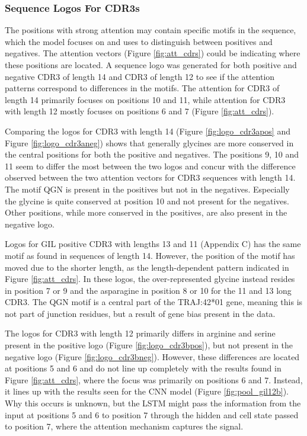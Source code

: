 \subsubsection{Sequence Logos For CDR3s}
The positions with strong attention may contain specific motifs in the sequence, which the model focuses on and uses to distinguish between positives and negatives. The attention vectors (Figure \ref{fig:att_cdrs}) could be indicating where these positions are located. A sequence logo was generated for both positive and negative CDR3{\textalpha} of length 14 and CDR3{\textbeta} of length 12 to see if the attention patterns correspond to differences in the motifs. The attention for CDR3{\textalpha} of length 14 primarily focuses on positions 10 and 11, while attention for CDR3{\textbeta} with length 12 mostly focuses on positions 6 and 7 (Figure \ref{fig:att_cdrs}). 

Comparing the logos for CDR3{\textalpha} with length 14 (Figure \ref{fig:logo_cdr3apos} and Figure \ref{fig:logo_cdr3aneg}) shows that generally glycines are more conserved in the central positions for both the positive and negatives. The positions 9, 10 and 11 seem to differ the most between the two logos and concur with the difference observed between the two attention vectors for CDR3{\textalpha} sequences with length 14. The motif QGN is present in the positives but not in the negatives. Especially the glycine is quite conserved at position 10 and not present for the negatives. Other positions, while more conserved in the positives, are also present in the negative logo.

Logos for GIL positive CDR3{\textalpha} with lengths 13 and 11 (Appendix C) has the same motif as found in sequences of length 14. However, the position of the motif has moved due to the shorter length, as the length-dependent pattern indicated in Figure \ref{fig:att_cdrs}. In these logos, the over-represented glycine instead resides in position 7 or 9 and the asparagine in position 8 or 10 for the 11 and 13 long CDR3{\textalpha}. The QGN motif is a central part of the TRAJ:42*01 gene, meaning this is not part of junction residues, but a result of gene bias present in the data.

The logos for CDR3{\textbeta} with length 12 primarily differs in arginine and serine present in the positive logo (Figure \ref{fig:logo_cdr3bpos}), but not present in the negative logo (Figure \ref{fig:logo_cdr3bneg}). However, these differences are located at positions 5 and 6 and do not line up completely with the results found in Figure \ref{fig:att_cdrs}, where the focus was primarily on positions 6 and 7. Instead, it lines up with the results seen for the CNN model (Figure \ref{fig:pool_gil12b}). Why this occurs is unknown, but the LSTM might pass the information from the input at positions 5 and 6 to position 7 through the hidden and cell state passed to position 7, where the attention mechanism captures the signal.

